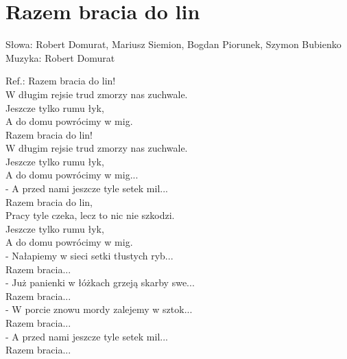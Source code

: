 \section{Razem bracia do lin}

Słowa: Robert Domurat, Mariusz Siemion, Bogdan Piorunek, Szymon Bubienko \\
Muzyka: Robert Domurat

\vspace{2em}
Ref.: Razem bracia do lin! \\
W długim rejsie trud zmorzy nas zuchwale. \\
Jeszcze tylko rumu łyk, \\
A do domu powrócimy w mig. \\

Razem bracia do lin! \\
W długim rejsie trud zmorzy nas zuchwale. \\
Jeszcze tylko rumu łyk, \\
A do domu powrócimy w mig... \\

- A przed nami jeszcze tyle setek mil... \\
Razem bracia do lin, \\
Pracy tyle czeka, lecz to nic nie szkodzi. \\
Jeszcze tylko rumu łyk, \\
A do domu powrócimy w mig. \\

- Nałapiemy w sieci setki tłustych ryb... \\
Razem bracia... \\

- Już panienki w łóżkach grzeją skarby swe... \\
Razem bracia... \\

- W porcie znowu mordy zalejemy w sztok... \\
Razem bracia... \\

- A przed nami jeszcze tyle setek mil... \\
Razem bracia...
